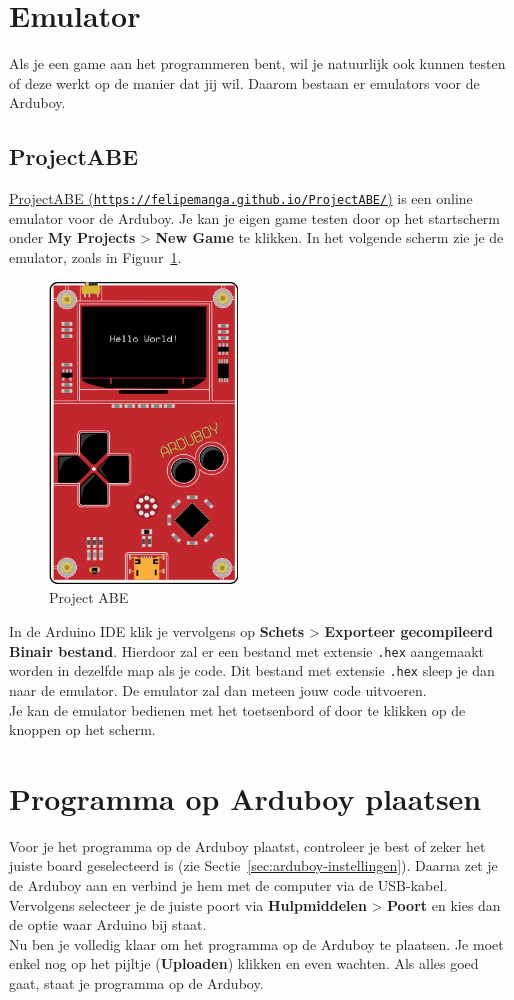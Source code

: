 \documentclass[11pt,fleqn]{book} %
\begin{document}
\newpage
\section{Emulator}
Als je een game aan het programmeren bent, wil je natuurlijk ook kunnen testen of deze werkt op de manier dat jij wil. Daarom bestaan er emulators voor de Arduboy.

\subsection{ProjectABE}
\href{https://felipemanga.github.io/ProjectABE/}{ProjectABE (\texttt{https://felipemanga.github.io/ProjectABE/})} is een online emulator voor de Arduboy.
Je kan je eigen game testen door op het startscherm onder \textbf{My Projects} > \textbf{New Game} te klikken. In het volgende scherm zie je de emulator, zoals in Figuur~\ref{fig:projectabe}.
\begin{figure}
	\centering
	\includegraphics[width=5cm]{assets/ProjectABE}
	\caption{Project ABE}
	\label{fig:projectabe}
\end{figure}
In de Arduino IDE klik je vervolgens op \textbf{Schets} > \textbf{Exporteer gecompileerd Binair bestand}. Hierdoor zal er een bestand met extensie \texttt{.hex} aangemaakt worden in dezelfde map als je code. Dit bestand met extensie \texttt{.hex} sleep je dan naar de emulator. De emulator zal dan meteen jouw code uitvoeren.\\
Je kan de emulator bedienen met het toetsenbord of door te klikken op de knoppen op het scherm.

\section{Programma op Arduboy plaatsen}
Voor je het programma op de Arduboy plaatst, controleer je best of zeker het juiste board geselecteerd is (zie Sectie~\ref{sec:arduboy-instellingen}). Daarna zet je de Arduboy aan en verbind je hem met de computer via de USB-kabel. Vervolgens selecteer je de juiste poort via \textbf{Hulpmiddelen} > \textbf{Poort} en kies dan de optie waar Arduino bij staat.\\
Nu ben je volledig klaar om het programma op de Arduboy te plaatsen. Je moet enkel nog op het pijltje (\textbf{Uploaden}) klikken en even wachten. Als alles goed gaat, staat je programma op de Arduboy.
\end{document}
